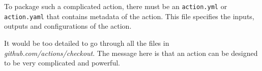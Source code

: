To package such a complicated action, there must be an \verb|action.yml| or \verb|action.yaml| that contains metadata of the action. This file specifies the inputs, outputs and configurations of the action.

It would be too detailed to go through all the files in \textit{github.com/actions/checkout}. The message here is that an action can be designed to be very complicated and powerful.

